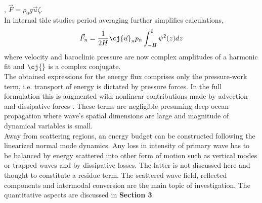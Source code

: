 \documentclass[12pt]{article}
\begin{document}
\citep{henry2001representation}, $\vec{F} = \rho_0 g \vec{u} \zeta$.\\
In internal tide studies period averaging further simplifies calculations,
\begin{align}
\vec{F}_n = \frac{1}{2H} \cj{\vec{u}}_n p_n \int_{-H}^0 \psi^2(z) dz
\end{align}
where velocity and baroclinic pressure are now complex amplitudes of a harmonic fit and $\cj{}$ is 
a complex conjugate.\\
The obtained expressions for the energy flux comprises only the pressure-work term, i.e. transport 
of energy is dictated by pressure forces. In the full formulation this is augmented with nonlinear 
contributions made by advection and dissipative forces \citep{gill2016atmosphere}. These terms 
are negligible presuming deep ocean propagation where wave's spatial dimensions are large and 
magnitude of dynamical variables is small.\\
Away from scattering regions, an energy budget can be constructed following the linearized normal 
mode dynamics. Any loss in intensity of primary wave has to be balanced by energy scattered into 
other form of motion such as vertical modes or trapped waves and by dissipative losses. The latter 
is not discussed here and thought to constitute a residue term. The scattered wave field, 
reflected components and intermodal conversion are the main topic of investigation. The 
quantitative aspects are discussed in \textbf{Section 3}.\\
\end{document}
